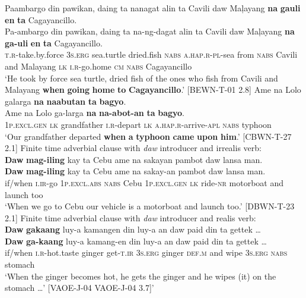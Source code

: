 Paambargo  din  pawikan,  daing  ta  nanagat  alin ta  Cavili  daw  Maļayang  \textbf{na}  \textbf{gauli}  \textbf{en}  \textbf{ta}  Cagayancillo. \smallskip\\
\gll Pa-ambargo  din  pawikan,  daing  ta  na-ng-dagat  alin ta  Cavili  daw  Maļayang  \textbf{na}  \textbf{ga-uli}  \textbf{en}  \textbf{ta}  Cagayancillo. \\
\textsc{t.r}-take.by.force  3\textsc{s.erg}  sea.turtle  dried.fish  \textsc{nabs}  \textsc{a.hap.r-pl}-sea  from
\textsc{nabs}  Cavili  and  Malayang  \textsc{lk}  \textsc{i.r}-go.home  \textsc{cm}  \textsc{nabs}  Cagayancillo \\
\glt `He took by force sea turtle, dried fish of the ones who fish from Cavili and Malayang \textbf{when} \textbf{going} \textbf{home} \textbf{to} \textbf{Cagayancillo}.’ [BEWN-T-01 2.8]
\z
\ea
Ame  na  Lolo  galarga  \textbf{na}  \textbf{naabutan}    \textbf{ta}  \textbf{bagyo}. \smallskip\\
\gll Ame  na  Lolo  ga-larga  \textbf{na}  \textbf{na-abot-an}    \textbf{ta}  \textbf{bagyo}. \\
1\textsc{p.excl.gen}  \textsc{lk}  grandfather  \textsc{i.r}-depart  \textsc{lk}  \textsc{a.hap.r}-arrive-\textsc{apl}  \textsc{nabs}  typhoon \\
\glt ‘Our grandfather departed \textbf{when} \textbf{a} \textbf{typhoon} \textbf{came} \textbf{upon} \textbf{him}.’ [CBWN-T-27 2.1]
\z
\ea
Finite time adverbial clause with \textit{daw} introducer and irrealis verb: \\
\textbf{Daw}  \textbf{mag-iling}  kay  ta  Cebu  ame  na  sakayan pambot  daw  lansa  man. \smallskip\\
\gll \textbf{Daw}  \textbf{mag-iling}  kay  ta  Cebu  ame  na  sakay-an pambot  daw  lansa  man. \\
if/when  \textsc{i.ir}-go  1\textsc{p.excl.abs}  \textsc{nabs}  Cebu  1\textsc{p.excl.gen}  \textsc{lk}  ride-\textsc{nr} motorboat  and  launch  too \\
\glt `When we go to Cebu our vehicle is a motorboat and launch too.’ [DBWN-T-23 2.1]
\z
\ea
Finite time adverbial clause with \textit{daw} introducer and realis verb: \\
\textbf{Daw}  \textbf{gakaang}  luy-a  kamangen  din  luy-a  an  daw  paid din  ta  gettek … \smallskip\\
\gll \textbf{Daw}  \textbf{ga-kaang}  luy-a  kamang-en  din  luy-a  an  daw  paid din  ta  gettek … \\
if/when  \textsc{i.r}-hot.taste  ginger  get-\textsc{t.ir}  3\textsc{s.erg}  ginger  \textsc{def.m}  and  wipe
3\textsc{s.erg}  \textsc{nabs}  stomach \\
\glt `When the ginger becomes hot, he gets the ginger and he wipes (it) on the stomach …’ [VAOE-J-04 VAOE-J-04 3.7]’
\z

